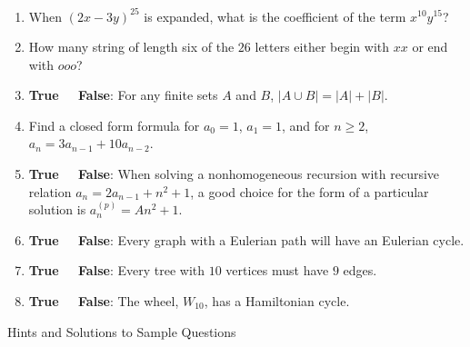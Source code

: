 \documentclass[11pt]{amsart}
\begin{document}
\begin{enumerate}
\medskip

\item When $(2x-3y)^{25}$ is expanded, what is the coefficient of the term $x^{10}y^{15}$?

\medskip

\item How many string of length six of the $26$ letters either begin with $xx$ or end with $ooo$?

\medskip

\item {\bf True \ \  False}: For any finite sets $A$ and $B$, $|A\cup B| = |A| + |B|$.

\medskip

\item Find a closed form formula for $a_0 = 1$, $a_1 = 1$, and for $n\geq2$, $a_n = 3a_{n-1} + 10a_{n-2}$.

\medskip

\item {\bf True \ \  False}: When solving a nonhomogeneous recursion with recursive relation
$a_n = 2a_{n-1} + n^2 + 1$, a good choice for the form of a particular solution is $a_n^{(p)} =  An^2 + 1$.

\medskip
 
 \item {\bf True \ \  False}: Every graph with a Eulerian path will have an Eulerian cycle.
 
 \medskip

\item {\bf True \ \  False}: Every tree with $10$ vertices must have $9$ edges. 

\medskip

\item {\bf True \ \  False}: The wheel, $W_{10}$, has a Hamiltonian cycle.

\end{enumerate}

\vskip 20pt


\begin{center}
Hints and Solutions to Sample Questions
\end{center}

\medskip
\end{document}
